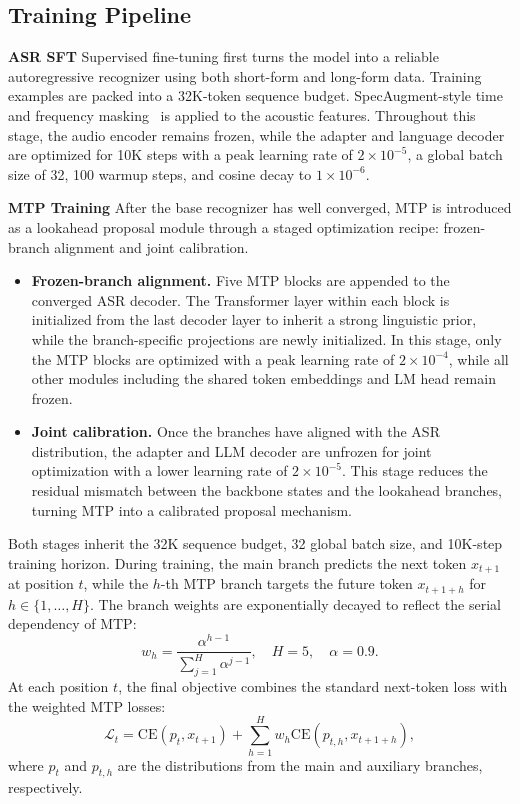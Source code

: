 \documentclass{llmxive}
\begin{document}
\subsection{Training Pipeline}

\textbf{ASR SFT} Supervised fine-tuning first turns the model into a reliable autoregressive recognizer using both short-form and long-form data. Training examples are packed into a 32K-token sequence budget. SpecAugment-style time and frequency masking~\citep{park2019specaugment} is applied to the acoustic features. Throughout this stage, the audio encoder remains frozen, while the adapter and language decoder are optimized for 10K steps with a peak learning rate of $2\times10^{-5}$, a global batch size of 32, 100 warmup steps, and cosine decay to $1\times10^{-6}$.

\textbf{MTP Training} After the base recognizer has well converged, MTP is introduced as a lookahead proposal module through a staged optimization recipe: frozen-branch alignment and joint calibration. 

\begin{itemize}
    \item \textbf{Frozen-branch alignment.} Five MTP blocks are appended to the converged ASR decoder. The Transformer layer within each block is initialized from the last decoder layer to inherit a strong linguistic prior, while the branch-specific projections are newly initialized. In this stage, only the MTP blocks are optimized with a peak learning rate of $2\times10^{-4}$, while all other modules including the shared token embeddings and LM head remain frozen. %
    \item \textbf{Joint calibration.} Once the branches have aligned with the ASR distribution, the adapter and LLM decoder are unfrozen for joint optimization with a lower learning rate of $2\times10^{-5}$. This stage reduces the residual mismatch between the backbone states and the lookahead branches, turning MTP into a calibrated proposal mechanism. %
\end{itemize}

Both stages inherit the 32K sequence budget, 32 global batch size, and 10K-step training horizon.
During training, the main branch predicts the next token $x_{t+1}$ at position $t$, while the $h$-th MTP branch targets the future token $x_{t+1+h}$ for $h\in\{1,\ldots,H\}$. The branch weights are exponentially decayed to reflect the serial dependency of MTP:
\[
w_h = \frac{\alpha^{h-1}}{\sum_{j=1}^{H}\alpha^{j-1}}, \quad H=5, \quad \alpha=0.9.
\]
At each position $t$, the final objective combines the standard next-token loss with the weighted MTP losses:
\[
\mathcal{L}_t = \mathrm{CE}(p_t, x_{t+1}) + \sum_{h=1}^{H} w_h \mathrm{CE}(p_{t,h}, x_{t+1+h}),
\]
where $p_t$ and $p_{t,h}$ are the distributions from the main and auxiliary branches, respectively.
\end{document}
